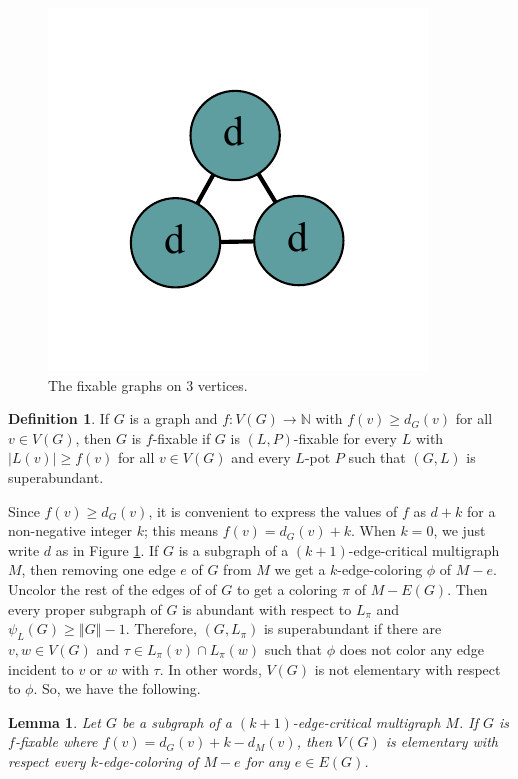\documentclass[12pt]{article}
\theoremstyle{plain}
\newtheorem{lem}[thm]{Lemma}
\theoremstyle{definition}
\newtheorem{defn}{Definition}
\theoremstyle{remark}
\newcommand{\IN}{\mathbb{N}}
\newcommand{\size}[1]{\left\Vert#1\right\Vert}
\newcommand{\func}[3]{#1\colon #2 \rightarrow #3}
\begin{document}
\begin{figure}[htb]
		\includegraphics[scale=0.5]{Superabundance/all/111[2,2,2].pdf}
		\caption{The fixable graphs on 3 vertices.}
		\label{fig:fixable3}
	\end{figure}
	
	\begin{defn}
		If $G$ is a graph and $\func{f}{V(G)}{\IN}$ with $f(v) \ge d_G(v)$ for all $v \in V(G)$, then $G$ is $f$-fixable if $G$ is $(L, P)$-fixable for every $L$ with $|L(v)| \ge f(v)$ for all $v \in V(G)$ and every $L$-pot $P$ such that $(G,L)$ is superabundant.
	\end{defn}
	
	Since $f(v) \ge d_G(v)$, it is convenient to express the values of $f$ as $d+k$ for a non-negative integer $k$; this means $f(v) = d_G(v) + k$.  When $k=0$, we just write $d$ as in Figure \ref{fig:fixable3}.  If $G$ is a subgraph of a $(k+1)$-edge-critical multigraph $M$, then removing one edge $e$ of $G$ from $M$ we get a $k$-edge-coloring $\phi$ of $M-e$.  Uncolor the rest of the edges of of $G$ to get a coloring $\pi$ of $M-E(G)$.  Then every proper subgraph of $G$ is abundant with respect to $L_\pi$ and $\psi_L(G) \ge \size{G} - 1$. Therefore, $(G, L_\pi)$ is superabundant if there are $v, w \in V(G)$ and $\tau \in L_\pi(v) \cap L_\pi(w)$ such that $\phi$ does not color any edge incident to $v$ or $w$ with $\tau$.  In other words, $V(G)$ is not elementary with respect to $\phi$.  So, we have the following.
	
	\begin{lem}\label{FixableNotElementary}
		 Let $G$ be a subgraph of a $(k+1)$-edge-critical multigraph $M$.  If $G$ is $f$-fixable where $f(v) = d_G(v) + k - d_M(v)$, then $V(G)$ is elementary with respect every $k$-edge-coloring of $M-e$ for any $e \in E(G)$.
	\end{lem}
	
\end{document}

